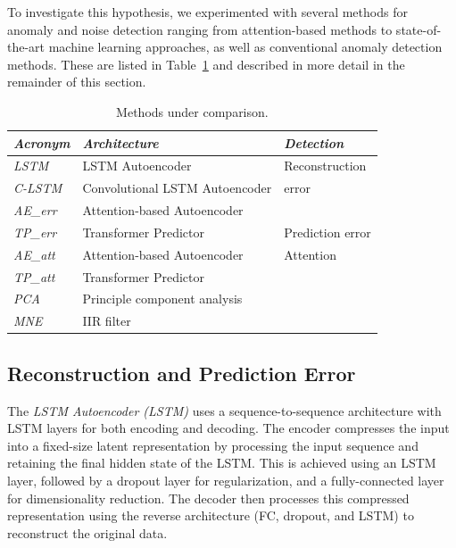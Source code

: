 \documentclass[conference]{IEEEtran}
\begin{document}
To investigate this hypothesis, we experimented with several methods
for anomaly and noise detection ranging from attention-based methods
to state-of-the-art machine learning approaches, as well as
conventional anomaly detection methods. These are listed in
Table~\ref{tab1} and described in more detail in the remainder of this
section.


\begin{table}[bt]
\centering
\caption{Methods under comparison.}
\label{tab1}
\begin{tabular}{lp{4cm}p{2cm}}
\toprule
\emph{Acronym}   & \emph{Architecture}& \emph{Detection}  \\
\midrule
\textit{LSTM}    & LSTM Autoencoder   & Reconstruction  \\
\textit{C-LSTM}  & Convolutional LSTM Autoencoder
                                      & error  \\
\textit{AE\_err} & Attention-based Autoencoder
                                      &   \\
\midrule
\textit{TP\_err} & Transformer Predictor
                                      & Prediction error  \\
\midrule
\textit{AE\_att} & Attention-based Autoencoder
                                      & Attention \\
\textit{TP\_att} & Transformer Predictor &  \\
\midrule
\textit{PCA}     & \multicolumn{2}{l}{Principle component analysis} \\
\textit{MNE}     & \multicolumn{2}{l}{IIR filter} \\
\bottomrule
\end{tabular} 
\end{table}


\subsection{Reconstruction and Prediction Error}

The \emph{LSTM Autoencoder (LSTM)} uses a sequence-to-sequence
architecture with LSTM layers for both encoding and decoding. The
encoder compresses the input into a fixed-size latent representation
by processing the input sequence and retaining the final hidden state
of the LSTM. This is achieved using an LSTM layer, followed by a
dropout layer for regularization, and a fully-connected layer for
dimensionality reduction. The decoder then processes this compressed
representation using the reverse architecture (FC, dropout, and LSTM)
to reconstruct the original data.
\end{document}
